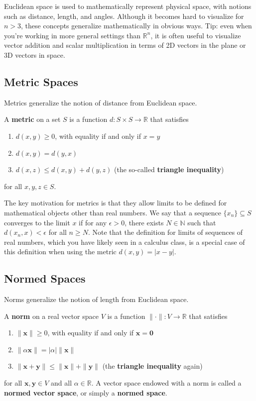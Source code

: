 \documentclass{article}
\newcommand{\N}{\mathbb{N}}
\newcommand{\R}{\mathbb{R}}
\renewcommand{\vec}[1]{\mathbf{#1}}
\newcommand{\term}[1]{\textbf{#1}}
\begin{document}
Euclidean space is used to mathematically represent physical space, with notions such as distance, length, and angles. Although it becomes hard to visualize for $n > 3$, these concepts generalize mathematically in obvious ways. Tip: even when you're working in more general settings than $\R^n$, it is often useful to visualize vector addition and scalar multiplication in terms of 2D vectors in the plane or 3D vectors in space.

\subsection{Metric Spaces}
Metrics generalize the notion of distance from Euclidean space.

A \term{metric} on a set $S$ is a function $d : S \times S \to \R$ that satisfies
\begin{enumerate}
\item $d(x,y) \geq 0$, with equality if and only if $x = y$
\item $d(x,y) = d(y,x)$
\item $d(x,z) \leq d(x,y) + d(y,z)$ (the so-called \term{triangle inequality})
\end{enumerate}
for all $x, y, z \in S$.

The key motivation for metrics is that they allow limits to be defined for mathematical objects other than real numbers. We say that a sequence $\{x_n\} \subseteq S$ converges to the limit $x$ if for any $\epsilon > 0$, there exists $N \in \N$ such that $d(x_n, x) < \epsilon$ for all $n \geq N$. Note that the definition for limits of sequences of real numbers, which you have likely seen in a calculus class, is a special case of this definition when using the metric $d(x, y) = |x-y|$.

\subsection{Normed Spaces}
Norms generalize the notion of length from Euclidean space.

A \term{norm} on a real vector space $V$ is a function $\|\cdot\| : V \to \R$ that satisfies
\begin{enumerate}
\item $\|\vec{x}\| \geq 0$, with equality if and only if $\vec{x} = \vec{0}$
\item $\|\alpha\vec{x}\| = |\alpha|\|\vec{x}\|$
\item $\|\vec{x}+\vec{y}\| \leq \|\vec{x}\| + \|\vec{y}\|$ (the \term{triangle inequality} again)
\end{enumerate}
for all $\vec{x}, \vec{y} \in V$ and all $\alpha \in \R$. A vector space endowed with a norm is called a \term{normed vector space}, or simply a \term{normed space}.
\end{document}
